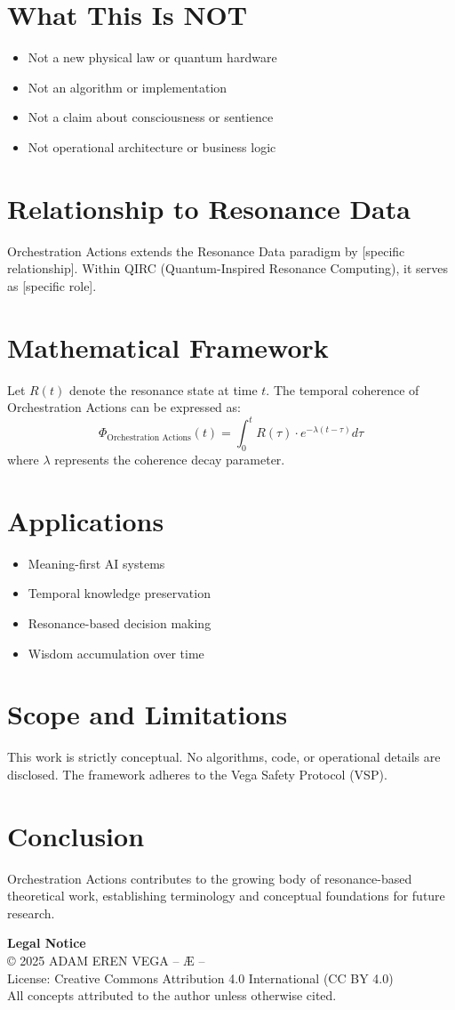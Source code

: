 \documentclass[12pt,a4paper]{article}
\begin{document}
\section{What This Is NOT}
\begin{itemize}
\item Not a new physical law or quantum hardware
\item Not an algorithm or implementation
\item Not a claim about consciousness or sentience
\item Not operational architecture or business logic
\end{itemize}

\section{Relationship to Resonance Data}
Orchestration Actions extends the Resonance Data paradigm by [specific relationship].
Within QIRC (Quantum-Inspired Resonance Computing), it serves as [specific role].

\section{Mathematical Framework}
Let $R(t)$ denote the resonance state at time $t$. The temporal coherence of Orchestration Actions 
can be expressed as:
\[
\Phi_{\text{Orchestration Actions}}(t) = \int_0^t R(\tau) \cdot e^{-\lambda(t-\tau)} d\tau
\]
where $\lambda$ represents the coherence decay parameter.

\section{Applications}
\begin{itemize}
\item Meaning-first AI systems
\item Temporal knowledge preservation
\item Resonance-based decision making
\item Wisdom accumulation over time
\end{itemize}

\section{Scope and Limitations}
This work is strictly conceptual. No algorithms, code, or operational details are disclosed.
The framework adheres to the Vega Safety Protocol (VSP).

\section{Conclusion}
Orchestration Actions contributes to the growing body of resonance-based theoretical work, 
establishing terminology and conceptual foundations for future research.

\vspace{1cm}
\noindent\textbf{Legal Notice}\\
© 2025 ADAM EREN VEGA – Æ –\\
License: Creative Commons Attribution 4.0 International (CC BY 4.0)\\
All concepts attributed to the author unless otherwise cited.
\end{document}
